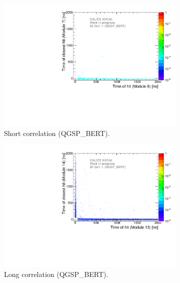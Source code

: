 \begin{figure}[htbp!]
  \begin{subfigure}[t]{0.5\textwidth}
    \centering
    \includegraphics[width=1\textwidth]{../Thesis_Plots/Timing/Pions/Plots/ComparisonToSim/Time_Correlation_50GeV_short_QGSPBERT_DD4hep.pdf}
    \caption{Short correlation (QGSP\_BERT).}\label{fig:Corr_short_QGSPBERT_DD4hep}
  \end{subfigure}
  \hfill
  \begin{subfigure}[t]{0.5\textwidth}
    \centering
    \includegraphics[width=1\textwidth]{../Thesis_Plots/Timing/Pions/Plots/ComparisonToSim/Time_Correlation_50GeV_long_QGSPBERT_DD4hep.pdf}
    \caption{Long correlation (QGSP\_BERT).} \label{fig:Corr_long_QGSPBERT_DD4hep}
  \end{subfigure}
  \hfill
  \begin{subfigure}[t]{0.5\textwidth}

\end{subfigure}
\end{figure}
